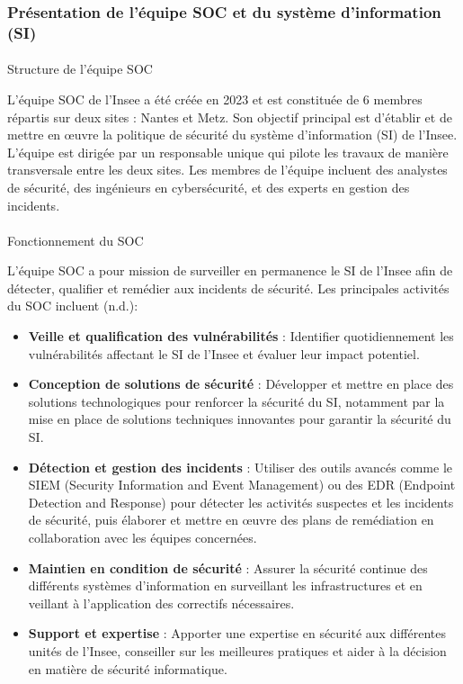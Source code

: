 \documentclass[
  letterpaper,
  DIV=11,
  numbers=noendperiod]{scrartcl}
\makeatletter
\let\oldparagraph\paragraph
\renewcommand{\paragraph}{
    \@ifstar
      \xxxParagraphStar
      \xxxParagraphNoStar
  }
\newcommand{\xxxParagraphStar}[1]{\oldparagraph*{#1}\mbox{}}
\newcommand{\xxxParagraphNoStar}[1]{\oldparagraph{#1}\mbox{}}
\makeatother
\begin{document}
\subsubsection{Présentation de l'équipe SOC et du système d'information
(SI)}\label{pruxe9sentation-de-luxe9quipe-soc-et-du-systuxe8me-dinformation-si}

\paragraph{Structure de l'équipe SOC}\label{structure-de-luxe9quipe-soc}

L'équipe SOC de l'Insee a été créée en 2023 et est constituée de 6
membres répartis sur deux sites : Nantes et Metz. Son objectif principal
est d'établir et de mettre en œuvre la politique de sécurité du système
d'information (SI) de l'Insee. L'équipe est dirigée par un responsable
unique qui pilote les travaux de manière transversale entre les deux
sites. Les membres de l'équipe incluent des analystes de sécurité, des
ingénieurs en cybersécurité, et des experts en gestion des incidents.

\paragraph{Fonctionnement du SOC}\label{fonctionnement-du-soc}

L'équipe SOC a pour mission de surveiller en permanence le SI de l'Insee
afin de détecter, qualifier et remédier aux incidents de sécurité. Les
principales activités du SOC incluent (n.d.):

\begin{itemize}
\item
  \textbf{Veille et qualification des vulnérabilités} : Identifier
  quotidiennement les vulnérabilités affectant le SI de l'Insee et
  évaluer leur impact potentiel.
\item
  \textbf{Conception de solutions de sécurité} : Développer et mettre en
  place des solutions technologiques pour renforcer la sécurité du SI,
  notamment par la mise en place de solutions techniques innovantes pour
  garantir la sécurité du SI.
\item
  \textbf{Détection et gestion des incidents} : Utiliser des outils
  avancés comme le SIEM (Security Information and Event Management) ou
  des EDR (Endpoint Detection and Response) pour détecter les activités
  suspectes et les incidents de sécurité, puis élaborer et mettre en
  œuvre des plans de remédiation en collaboration avec les équipes
  concernées.
\item
  \textbf{Maintien en condition de sécurité} : Assurer la sécurité
  continue des différents systèmes d'information en surveillant les
  infrastructures et en veillant à l'application des correctifs
  nécessaires.
\item
  \textbf{Support et expertise} : Apporter une expertise en sécurité aux
  différentes unités de l'Insee, conseiller sur les meilleures pratiques
  et aider à la décision en matière de sécurité informatique.
\end{itemize}
\end{document}
